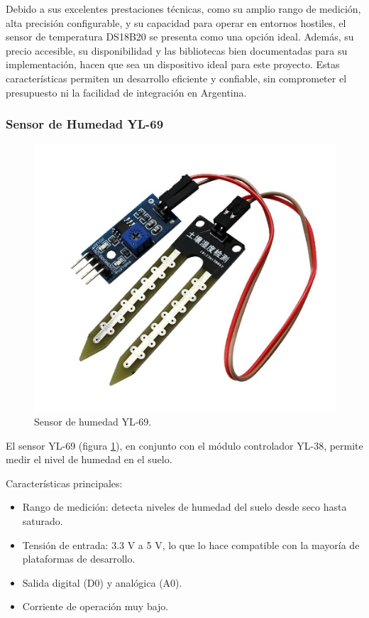 Debido a sus excelentes prestaciones técnicas, como su amplio rango de medición, alta precisión configurable, y su capacidad para operar en entornos hostiles, el sensor de temperatura DS18B20 se presenta como una opción ideal. Además, su precio accesible, su disponibilidad y las bibliotecas bien documentadas para su implementación, hacen que sea un dispositivo ideal para este proyecto. Estas características permiten un desarrollo eficiente y confiable, sin comprometer el presupuesto ni la facilidad de integración en Argentina.

\subsubsection{Sensor de Humedad YL-69}

\begin{figure}[H]
	\centering
	\includegraphics[scale=1]{./Figures/Hardware/Sensores/sensorhumedad.png}
	\caption{Sensor de humedad YL-69.}
	\label{fig:SensorHumedad}
\end{figure}

\label{sec:SensorHumedad}

El sensor YL-69 (figura \ref{fig:SensorHumedad}), en conjunto con el módulo controlador YL-38, permite medir el nivel de humedad en el suelo.  

Características principales:

\begin{itemize}
    \item Rango de medición: detecta niveles de humedad del suelo desde seco hasta saturado.
    \item Tensión de entrada: 3.3 V a 5 V, lo que lo hace compatible con la mayoría de plataformas de desarrollo.
    \item Salida digital (D0) y analógica (A0).
    \item Corriente de operación muy bajo.
\end{itemize}

